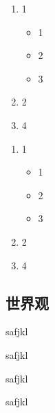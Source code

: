 \begin{multicols}{2}
\begin{enumerate}
	\item 1
	\begin{itemize}
		\item 1
		\item 2
		\item 3
	\end{itemize}	
	\item 2
	\item 4
\end{enumerate}
\columnbreak
{}
\begin{enumerate}
	\item 1
	\begin{itemize}
		\item 1
		\item 2
		\item 3
	\end{itemize}	
	\item 2
	\item 4
\end{enumerate}
\end{multicols}

\subsection{世界观}\label{2-1-3}

\exercises[1]

\begin{exe}[0]
	safjkl
\end{exe}

\begin{exe}[0]
	safjkl
\end{exe}

\begin{exe}[0]
	safjkl
\end{exe}

\begin{exe}[0]
	safjkl
\end{exe}

\answers

\newpage\pagecolor{white}
